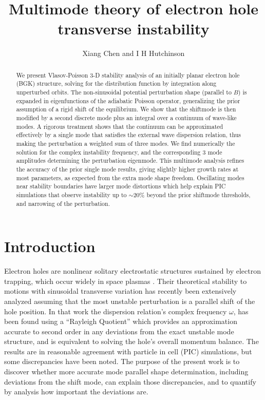 \documentclass[12pt]{article}
\title{Multimode theory of electron hole transverse instability}
\author{Xiang Chen and I H Hutchinson}
\begin{document}
\maketitle

\begin{abstract}
  We present Vlasov-Poisson 3-D stability analysis of an initially
  planar electron hole (BGK) structure, solving for the distribution
  function by integration along unperturbed orbits. The non-sinusoidal
  potential perturbation shape (parallel to $B$) is expanded in
  eigenfunctions of the adiabatic Poisson operator, generalizing the
  prior assumption of a rigid shift of the equilibrium.  We show that
  the shiftmode is then modified by a second discrete mode plus an
  integral over a continuum of wave-like modes. A rigorous treatment
  shows that the continuum can be approximated effectively by a single
  mode that satisfies the external wave dispersion relation, thus
  making the perturbation a weighted sum of three modes. We find
  numerically the solution for the complex instability frequency, and
  the corresponding 3 mode amplitudes determining the perturbation
  eigenmode. This multimode analysis refines the accuracy of the prior
  single mode results, giving slightly higher growth rates at most
  parameters, as expected from the extra mode shape
  freedom. Oscillating modes near stability boundaries have larger
  mode distortions which help explain PIC simulations that observe
  instability up to $\sim20$\% beyond the prior shiftmode thresholds,
  and narrowing of the perturbation.
\end{abstract}

\section{Introduction}

Electron holes are nonlinear solitary electrostatic structures
sustained by electron trapping\cite{Hutchinson2017}, which occur
widely in space plasmas \cite[for a summary of observations see
e.g.][and references therein]{Lotekar2020}.  Their theoretical
stability to motions with sinusoidal transverse variation has recently
been extensively analyzed assuming that the most unstable perturbation
is a parallel shift of the hole
position\cite{Hutchinson2018,Hutchinson2018a,Hutchinson2019,Hutchinson2019a,Hutchinson2021d}. In
that work the dispersion relation's complex frequency $\omega$, has
been found using a ``Rayleigh Quotient''\cite{Parlett1974} which
provides an approximation accurate to second order in any deviations
from the exact unstable mode structure, and is equivalent to solving
the hole's overall momentum balance\cite{Hutchinson2016}. The results
are in reasonable agreement with particle in cell (PIC) simulations, but some
discrepancies have been noted. The purpose of the present work is to
discover whether more accurate mode parallel shape determination,
including deviations from the shift mode, can explain those
discrepancies, and to quantify by analysis how important the
deviations are.
\end{document}
